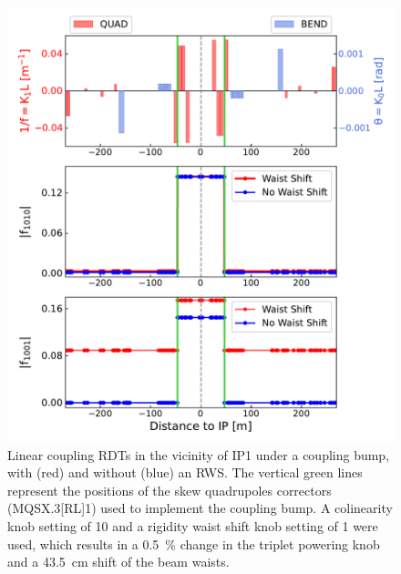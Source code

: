 \begin{figure}[!htb]
    \centering
    \includegraphics*[width=\columnwidth]{Figures/IR_Coupling_Correction/waist_shift_leaks_rdts.pdf}
    \caption{Linear coupling RDTs in the vicinity of IP\num{1} under a coupling bump, with (\textcolor{mplr}{red}) and without (\textcolor{mplb}{blue}) an RWS. The vertical \textcolor{mqsx_green}{green} lines represent the positions of the skew quadrupoles correctors (MQSX.\num{3}[RL]\num{1}) used to implement the coupling bump. A colinearity knob setting of \num{10} and a rigidity waist shift knob setting of \num{1} were used, which results in a \qty{0.5}{\percent} change in the triplet powering knob and a \qty{43.5}{\centi\meter} shift of the beam waists.}
    \label{figure:rdt_leak}
\end{figure}

